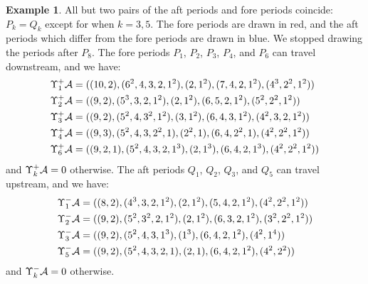 \documentclass[12pt]{amsart}
\numberwithin{equation}{section}
\theoremstyle{definition}
\newtheorem{example}[equation]{Example}
\begin{document}
\begin{example}
All but two pairs of the aft periods and fore periods coincide: $P_k=Q_k$ except for when $k=3,5$. The fore periods are drawn in red, and the aft periods which differ from the fore periods are drawn in blue. We stopped drawing the periods after $P_8$. The fore periods $P_1$, $P_2$, $P_3$, $P_4$, and $P_6$ can travel downstream, and we have:
\begin{align*}
\Upsilon_1^+\mathcal{A}&=((10,2),(6^2,4,3,2,1^2),(2,1^2),(7,4,2,1^2),(4^3,2^2,1^2))\\
\Upsilon_2^+\mathcal{A}&=((9,2),(5^3,3,2,1^2),(2,1^2),(6,5,2,1^2),(5^2,2^2,1^2))\\
\Upsilon_3^+\mathcal{A}&=((9,2),(5^2,4,3^2,1^2),(3,1^2),(6,4,3,1^2),(4^2,3,2,1^2))\\
\Upsilon_4^+\mathcal{A}&=((9,3),(5^2,4,3,2^2,1),(2^2,1),(6,4,2^2,1),(4^2,2^2,1^2))\\
\Upsilon_6^+\mathcal{A}&=((9,2,1),(5^2,4,3,2,1^3),(2,1^3),(6,4,2,1^3),(4^2,2^2,1^2))
\end{align*}
and $\Upsilon_k^+\mathcal{A}=0$ otherwise. The aft periods $Q_1$, $Q_2$, $Q_3$, and $Q_5$ can travel upstream, and we have:
\begin{align*}
\Upsilon_1^-\mathcal{A}&=((8,2),(4^3,3,2,1^2),(2,1^2),(5,4,2,1^2),(4^2,2^2,1^2))\\
\Upsilon_2^-\mathcal{A}&=((9,2),(5^2,3^2,2,1^2),(2,1^2),(6,3,2,1^2),(3^2,2^2,1^2))\\
\Upsilon_3^-\mathcal{A}&=((9,2),(5^2,4,3,1^3),(1^3),(6,4,2,1^2),(4^2,1^4))\\
\Upsilon_5^-\mathcal{A}&=((9,2),(5^2,4,3,2,1),(2,1),(6,4,2,1^2),(4^2,2^2))
\end{align*}
and $\Upsilon_k^-\mathcal{A}=0$ otherwise.
\end{example}
\end{document}
